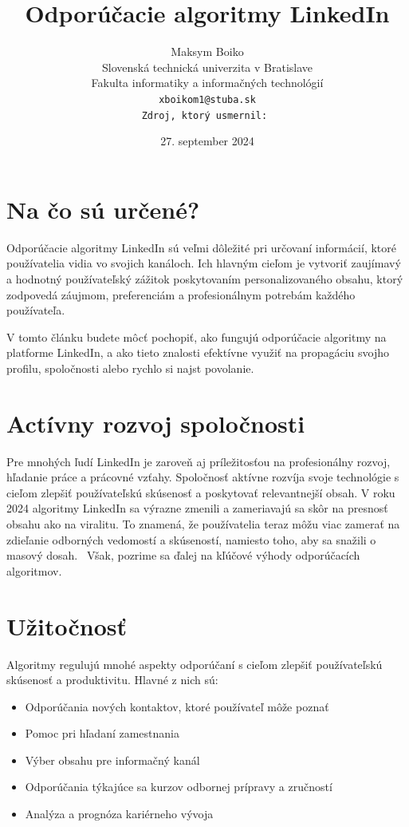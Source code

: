 \documentclass[slovak,a4paper]{coursepaper}
\title{Odporúčacie algoritmy LinkedIn\centering}
\author{Maksym Boiko\\[2pt]
{ Slovenská technická univerzita v Bratislave}\\
{ Fakulta informatiky a informačných technológií}\\
{\texttt{xboikom1@stuba.sk}}\\
{\texttt{Zdroj, ktorý usmernil:~\cite{1}}}
}
\date{\small 27. september 2024}
\begin{document}
\maketitle

\section{Na čo sú určené?}
Odporúčacie algoritmy LinkedIn sú veľmi dôležité pri určovaní informácií, ktoré používatelia vidia vo svojich kanáloch. Ich hlavným cieľom je vytvoriť zaujímavý a hodnotný používateľský zážitok poskytovaním personalizovaného obsahu, ktorý zodpovedá záujmom, preferenciám a profesionálnym potrebám každého používateľa.

V tomto článku budete môcť pochopiť, ako fungujú odporúčacie algoritmy na platforme LinkedIn, a ako tieto znalosti efektívne využiť na propagáciu svojho profilu, spoločnosti alebo rychlo si najst povolanie.~\cite{Gabric:article}

\section{Actívny rozvoj spoločnosti} \label{rozvoj spoločnosti}

Pre mnohých ľudí LinkedIn je zaroveň aj príležitosťou na profesionálny rozvoj, hľadanie práce a prácovné vzťahy.
Spoločnosť aktívne rozvíja svoje technológie s cieľom zlepšiť používateľskú skúsenosť a poskytovať relevantnejší obsah. V roku 2024 algoritmy LinkedIn sa výrazne zmenili a zameriavajú sa skôr na presnosť obsahu ako na viralitu. To znamená, že používatelia teraz môžu viac zamerať na zdieľanie odborných vedomostí a skúseností, namiesto toho, aby sa snažili o masový dosah.~\cite{1} Však, pozrime sa ďalej na kľúčové výhody odporúčacích algoritmov.

\section{Užitočnosť} \label{Užitočnosť}
Algoritmy regulujú mnohé aspekty odporúčaní s cieľom zlepšiť používateľskú skúsenosť a produktivitu. Hlavné z nich sú:

\begin{itemize}
	\item Odporúčania nových kontaktov, ktoré používateľ môže poznať
	\item Pomoc pri hľadaní zamestnania
	\item Výber obsahu pre informačný kanál
	\item Odporúčania týkajúce sa kurzov odbornej prípravy a zručností
	\item Analýza a prognóza kariérneho vývoja
  \end{itemize}
\end{document}
